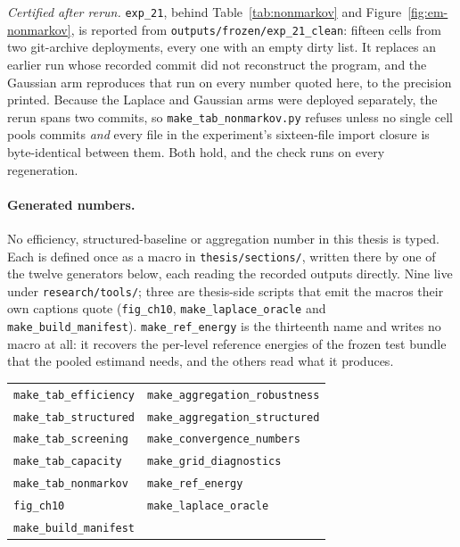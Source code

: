 \emph{Certified after rerun.} \texttt{exp\_21}, behind
Table~\ref{tab:nonmarkov} and Figure~\ref{fig:em-nonmarkov}, is reported from
\texttt{outputs/frozen/exp\_21\_clean}: fifteen cells from two git-archive
deployments, every one with an empty dirty list. It replaces an earlier run
whose recorded commit did not reconstruct the program, and the Gaussian arm
reproduces that run on every number quoted here, to the precision printed.
Because the Laplace and Gaussian arms were deployed separately, the rerun spans
two commits, so \texttt{make\_tab\_nonmarkov.py} refuses unless no single cell
pools commits \emph{and} every file in the experiment's sixteen-file import
closure is byte-identical between them. Both hold, and the check runs on every
regeneration.

\paragraph{Generated numbers.} No efficiency, structured-baseline or
aggregation number in this thesis is typed. Each is defined once as a macro in
\texttt{thesis/sections/}, written there by one of the twelve generators
below, each reading the recorded outputs directly. Nine live under
\texttt{research/tools/}; three are thesis-side scripts that emit the macros
their own captions quote (\texttt{fig\_ch10},
\texttt{make\_laplace\_oracle} and \texttt{make\_build\_manifest}).
\texttt{make\_ref\_energy} is the thirteenth name and writes no macro at all:
it recovers the per-level reference energies of the frozen test bundle that
the pooled estimand needs, and the others read what it produces.

\begin{center}\small
\begin{tabular}{@{}ll@{}}
\texttt{make\_tab\_efficiency} & \texttt{make\_aggregation\_robustness} \\
\texttt{make\_tab\_structured} & \texttt{make\_aggregation\_structured} \\
\texttt{make\_tab\_screening}  & \texttt{make\_convergence\_numbers} \\
\texttt{make\_tab\_capacity}   & \texttt{make\_grid\_diagnostics} \\
\texttt{make\_tab\_nonmarkov}  & \texttt{make\_ref\_energy} \\
\texttt{fig\_ch10}             & \texttt{make\_laplace\_oracle} \\
\texttt{make\_build\_manifest} & \\
\end{tabular}
\end{center}

